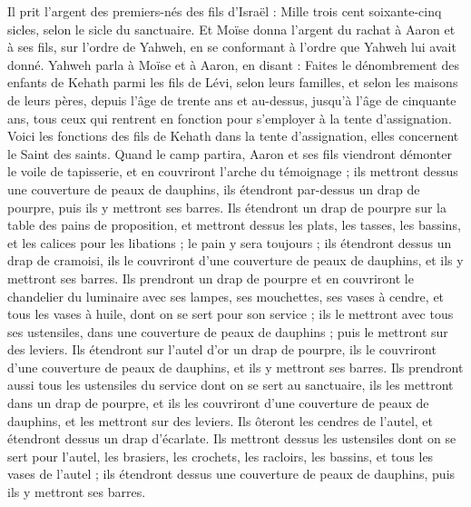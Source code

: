 \begin{multicols}{2}
Il prit l'argent des premiers-nés des fils d'Israël : Mille trois cent soixante-cinq sicles, selon le sicle du sanctuaire.
Et Moïse donna l'argent du rachat à Aaron et à ses fils, sur l’ordre de Yahweh, en se conformant à l’ordre que Yahweh lui avait donné.
\VerseOne{}Yahweh parla à Moïse et à Aaron, en disant :
Faites le dénombrement des enfants de Kehath parmi les fils de Lévi, selon leurs familles, et selon les maisons de leurs pères,
depuis l'âge de trente ans et au-dessus, jusqu'à l'âge de cinquante ans, tous ceux qui rentrent en fonction pour s'employer à la tente d'assignation.
Voici les fonctions des fils de Kehath dans la tente d'assignation, elles concernent le Saint des saints.
Quand le camp partira, Aaron et ses fils viendront démonter le voile de tapisserie, et en couvriront l'arche du témoignage ;
ils mettront dessus une couverture de peaux de dauphins, ils étendront par-dessus un drap de pourpre, puis ils y mettront ses barres.
Ils étendront un drap de pourpre sur la table des pains de proposition, et mettront dessus les plats, les tasses, les bassins, et les calices pour les libations ; le pain y sera toujours ;
ils étendront dessus un drap de cramoisi, ils le couvriront d'une couverture de peaux de dauphins, et ils y mettront ses barres.
Ils prendront un drap de pourpre et en couvriront le chandelier du luminaire avec ses lampes, ses mouchettes, ses vases à cendre, et tous les vases à huile, dont on se sert pour son service ;
ils le mettront avec tous ses ustensiles, dans une couverture de peaux de dauphins ; puis le mettront sur des leviers.
Ils étendront sur l'autel d'or un drap de pourpre, ils le couvriront d'une couverture de peaux de dauphins, et ils y mettront ses barres.
Ils prendront aussi tous les ustensiles du service dont on se sert au sanctuaire, ils les mettront dans un drap de pourpre, et ils les couvriront d'une couverture de peaux de dauphins, et les mettront sur des leviers.
Ils ôteront les cendres de l'autel, et étendront dessus un drap d'écarlate.
Ils mettront dessus les ustensiles dont on se sert pour l'autel, les brasiers, les crochets, les racloirs, les bassins, et tous les vases de l'autel ; ils étendront dessus une couverture de peaux de dauphins, puis ils y mettront ses barres.

\end{multicols}
